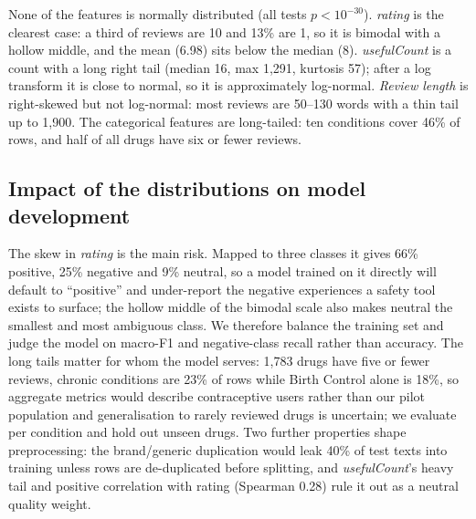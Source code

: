 \documentclass[11pt]{article}
\begin{document}
None of the features is normally distributed (all tests $p<10^{-30}$). \emph{rating} is the clearest case: a third of reviews are 10 and 13\% are 1, so it is bimodal with a hollow middle, and the mean (6.98) sits below the median (8). \emph{usefulCount} is a count with a long right tail (median 16, max 1,291, kurtosis 57); after a log transform it is close to normal, so it is approximately log-normal. \emph{Review length} is right-skewed but not log-normal: most reviews are 50--130 words with a thin tail up to 1,900. The categorical features are long-tailed: ten conditions cover 46\% of rows, and half of all drugs have six or fewer reviews.

\subsection{Impact of the distributions on model development}
The skew in \emph{rating} is the main risk. Mapped to three classes it gives 66\% positive, 25\% negative and 9\% neutral, so a model trained on it directly will default to ``positive'' and under-report the negative experiences a safety tool exists to surface; the hollow middle of the bimodal scale also makes neutral the smallest and most ambiguous class. We therefore balance the training set and judge the model on macro-F1 and negative-class recall rather than accuracy. The long tails matter for whom the model serves: 1,783 drugs have five or fewer reviews, chronic conditions are 23\% of rows while Birth Control alone is 18\%, so aggregate metrics would describe contraceptive users rather than our pilot population and generalisation to rarely reviewed drugs is uncertain; we evaluate per condition and hold out unseen drugs. Two further properties shape preprocessing: the brand/generic duplication would leak 40\% of test texts into training unless rows are de-duplicated before splitting, and \emph{usefulCount}'s heavy tail and positive correlation with rating (Spearman 0.28) rule it out as a neutral quality weight.
\end{document}
